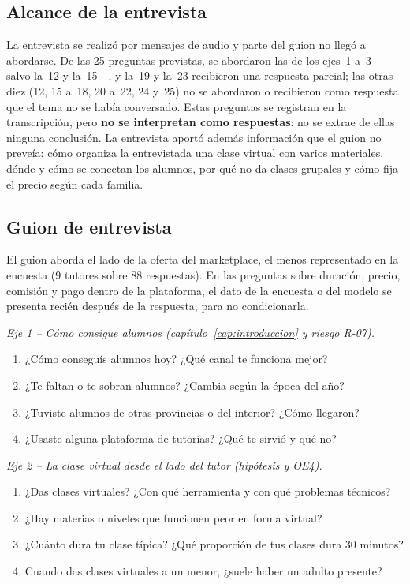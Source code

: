 \subsection{Alcance de la entrevista}

La entrevista se realizó por mensajes de audio y parte del guion no
llegó a abordarse. De las 25 preguntas previstas, se abordaron las de los
ejes~1 a~3 ---salvo la~12 y la~15---, y la~19 y la~23 recibieron una
respuesta parcial; las otras diez (12, 15 a~18, 20 a~22, 24 y~25) no se
abordaron o recibieron como respuesta que el tema no se había
conversado. Estas preguntas se registran en la
transcripción, pero \textbf{no se interpretan como respuestas}: no se
extrae de ellas ninguna conclusión. La entrevista aportó además
información que el guion no preveía: cómo organiza la entrevistada una
clase virtual con varios materiales, dónde y cómo se conectan los
alumnos, por qué no da clases grupales y cómo fija el precio según cada
familia.

\subsection{Guion de entrevista}\label{sec:guion-perfil2}

El guion aborda el lado de la oferta del \gls{marketplace}, el menos
representado en la encuesta (9 tutores sobre 88 respuestas). En las
preguntas sobre duración, precio, comisión y pago dentro de la
plataforma, el dato de la encuesta o del modelo se presenta recién
después de la respuesta, para no condicionarla.

\emph{Eje 1 -- Cómo consigue alumnos (capítulo~\ref{cap:introduccion} y
riesgo R-07).}

\begin{enumerate}
    \item ¿Cómo conseguís alumnos hoy? ¿Qué canal te funciona mejor?
    \item ¿Te faltan o te sobran alumnos? ¿Cambia según la época del año?
    \item ¿Tuviste alumnos de otras provincias o del interior? ¿Cómo
          llegaron?
    \item ¿Usaste alguna plataforma de tutorías? ¿Qué te sirvió y qué no?
\end{enumerate}

\emph{Eje 2 -- La clase virtual desde el lado del tutor (hipótesis y
OE4).}

\begin{enumerate}[resume]
    \item ¿Das clases virtuales? ¿Con qué herramienta y con qué problemas
          técnicos?
    \item ¿Hay materias o niveles que funcionen peor en forma virtual?
    \item ¿Cuánto dura tu clase típica? ¿Qué proporción de tus clases dura
          30 minutos?
    \item Cuando das clases virtuales a un menor, ¿suele haber un adulto
          presente?
\end{enumerate}

